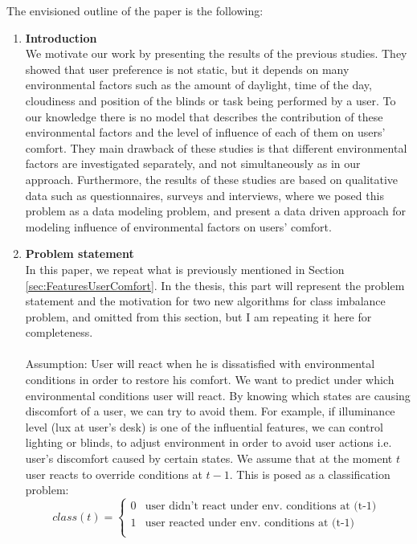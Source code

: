 \documentclass[a4paper]{article}
\begin{document}
The envisioned outline of the paper is the following:
\begin{enumerate}[I]
\item \textbf{Introduction}\\
We motivate our work by presenting the results of the previous studies. They showed that user preference is not static, but it depends on many environmental factors such as the amount of daylight, time of the day, cloudiness and position of the blinds or task being performed by a user. To our knowledge there is no model that describes the contribution of these environmental factors and the level of influence of each of them on users' comfort. They main drawback of these studies is that different environmental factors are investigated separately, and not simultaneously as in our approach. Furthermore, the results of these studies are based on qualitative data such as questionnaires, surveys and interviews, where we posed this problem as a data modeling problem, and present a data driven approach for modeling influence of environmental factors on users' comfort. 

\item \textbf{Problem statement}
\\
\color{red} In this paper, we repeat what is previously mentioned in Section \ref{sec:FeaturesUserComfort}. In the thesis, this part will represent the problem statement and the motivation for two new algorithms for class imbalance problem, and omitted from this section, but I am repeating it here for completeness. \color{black}
\\\\
Assumption: User will react when he is dissatisfied with environmental conditions in order to restore his comfort. We want to predict under which environmental conditions user will react. By knowing which states are causing discomfort of a user, we can try to avoid them. For example, if illuminance level (lux at user's desk) is one of the influential features, we can control lighting or blinds, to adjust environment in order to avoid user actions i.e. user's discomfort caused by certain states. We assume that at the moment $t$ user reacts to override conditions at $t-1$. This is posed as a classification problem:
\begin{equation}
class(t) = 
\begin{cases}
0 & \text{user didn't react under env. conditions at (t-1) }\\
1 & \text{user reacted under env. conditions at (t-1)}\\
\end{cases}
\end{equation}


\end{enumerate}
\end{document}
